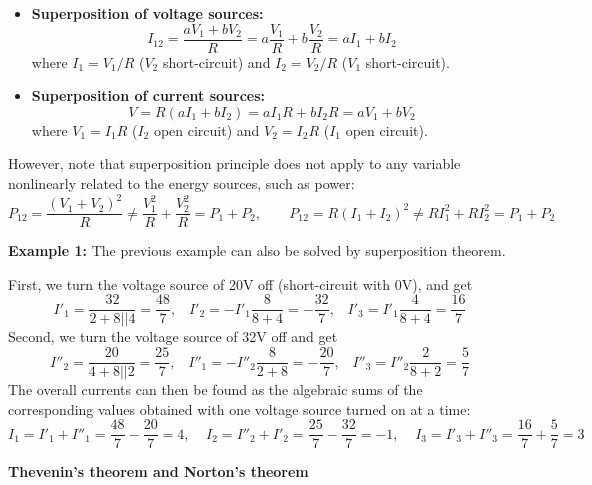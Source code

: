 \documentclass{article}
\begin{document}
\begin{itemize}
\begin{itemize}
\item {\bf Superposition of voltage sources:}
  \begin{equation}	
    I_{12}=\frac{aV_1+bV_2}{R}=a\frac{V_1}{R}+b\frac{V_2}{R}=aI_1+bI_2 
  \end{equation}
  where $I_1=V_1/R$ ($V_2$ short-circuit) and $I_2=V_2/R$ ($V_1$ short-circuit).

\item {\bf Superposition of current sources:}
  \begin{equation}
    V=R(aI_1+bI_2)=aI_1R+bI_2R=aV_1+bV_2 
  \end{equation}
  where $V_1=I_1R$ ($I_2$ open circuit) and $V_2=I_2R$ ($I_1$ open circuit).
\end{itemize}

However, note that superposition principle does not apply to any variable
nonlinearly related to the energy sources, such as power:
\begin{equation}
  P_{12}=\frac{(V_1+V_2)^2}{R}\ne\frac{V_1^2}{R}+\frac{V_2^2}{R}=P_1+P_2,
  \;\;\;\;\;\;\;
  P_{12}=R(I_1+I_2)^2 \ne RI_1^2+RI_2^2=P_1+P_2	
\end{equation}

{\bf Example 1:} The previous example can also be solved by superposition 
theorem. 


First, we turn the voltage source of 20V off (short-circuit with 0V), and get
\begin{equation} 
  I'_1=\frac{32}{2+8 || 4}=\frac{48}{7},\;\;\;I'_2=-I'_1\frac{8}{8+4}=-\frac{32}{7},
  \;\;\;I'_3=I'_1\frac{4}{8+4}=\frac{16}{7} 
\end{equation}
Second, we turn the voltage source of 32V off and get
\begin{equation}
  I''_2=\frac{20}{4+8 || 2}=\frac{25}{7},\;\;\;I''_1=-I''_2\frac{8}{2+8}=-\frac{20}{7},
  \;\;\;I''_3=I''_2\frac{2}{8+2}=\frac{5}{7} 
\end{equation}
The overall currents can then be found as the algebraic sums of the
corresponding values obtained with one voltage source turned on at a time:
\begin{equation} 
  I_1=I'_1+I''_1=\frac{48}{7}-\frac{20}{7}=4,\;\;\;\;
  I_2=I''_2+I'_2=\frac{25}{7}-\frac{32}{7}=-1,\;\;\;\;
  I_3=I'_3+I''_3=\frac{16}{7}+\frac{5}{7}=3 
\end{equation}

{\bf Thevenin's theorem and Norton's theorem}


\end{itemize}
\end{document}
